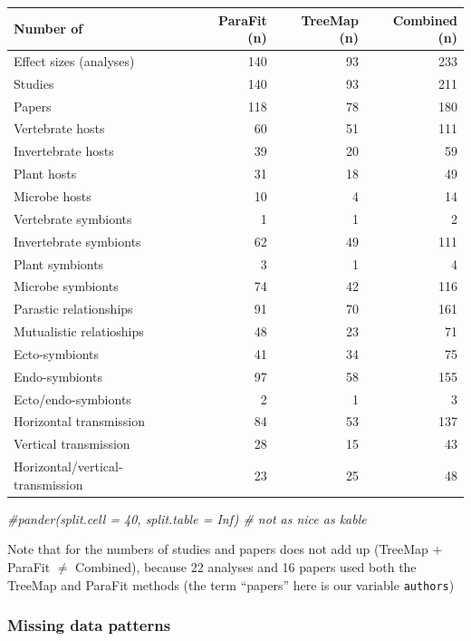 \documentclass[
]{article}
\newenvironment{Shaded}{\begin{snugshade}}{\end{snugshade}}
\newcommand{\CommentTok}[1]{\textcolor[rgb]{0.56,0.35,0.01}{\textit{#1}}}
\begin{document}
\begin{tabular}{l|r|r|r}
\hline
Number of & ParaFit (n) & TreeMap (n) & Combined (n)\\
\hline
Effect sizes (analyses) & 140 & 93 & 233\\
\hline
Studies & 140 & 93 & 211\\
\hline
Papers & 118 & 78 & 180\\
\hline
Vertebrate hosts & 60 & 51 & 111\\
\hline
Invertebrate hosts & 39 & 20 & 59\\
\hline
Plant hosts & 31 & 18 & 49\\
\hline
Microbe hosts & 10 & 4 & 14\\
\hline
Vertebrate symbionts & 1 & 1 & 2\\
\hline
Invertebrate symbionts & 62 & 49 & 111\\
\hline
Plant symbionts & 3 & 1 & 4\\
\hline
Microbe symbionts & 74 & 42 & 116\\
\hline
Parastic relationships & 91 & 70 & 161\\
\hline
Mutualistic relatioships & 48 & 23 & 71\\
\hline
Ecto-symbionts & 41 & 34 & 75\\
\hline
Endo-symbionts & 97 & 58 & 155\\
\hline
Ecto/endo-symbionts & 2 & 1 & 3\\
\hline
Horizontal transmission & 84 & 53 & 137\\
\hline
Vertical transmission & 28 & 15 & 43\\
\hline
Horizontal/vertical-transmission & 23 & 25 & 48\\
\hline
\end{tabular}

\begin{Shaded}
\begin{Highlighting}[]
  \CommentTok{#pander(split.cell = 40, split.table = Inf) # not as nice as kable}
\end{Highlighting}
\end{Shaded}

Note that for the numbers of studies and papers does not add up (TreeMap
+ ParaFit \(\neq\) Combined), because 22 analyses and 16 papers used
both the TreeMap and ParaFit methods (the term ``papers'' here is our
variable \texttt{authors})

\hypertarget{missing-data-patterns}{%
\subsubsection{Missing data patterns}\label{missing-data-patterns}}
\end{document}
